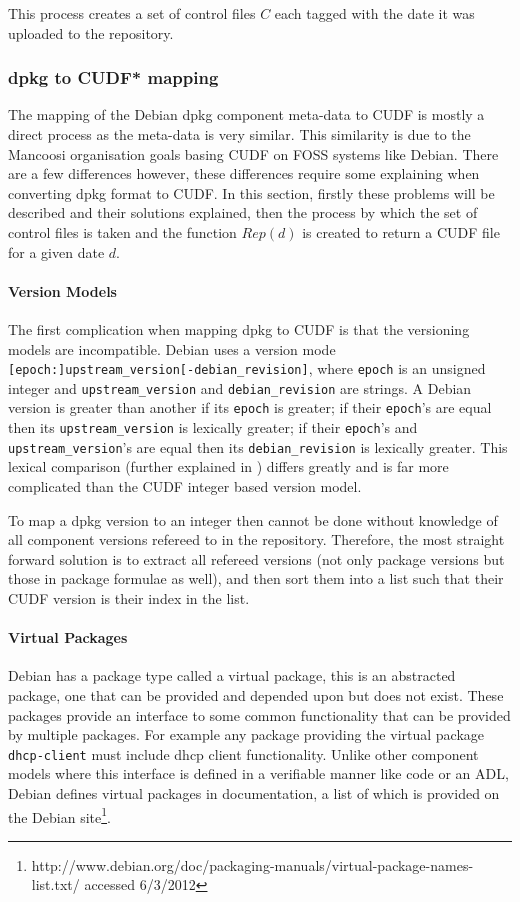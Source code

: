 This process creates a set of control files $C$ each tagged with the date it was uploaded to the repository.

\subsubsection{dpkg to CUDF* mapping}
\label{ubuntusimulation.debtocudf}
The mapping of the Debian dpkg component meta-data to CUDF is mostly a direct process as the meta-data is very similar.
This similarity is due to the Mancoosi organisation goals basing CUDF on FOSS systems like Debian.  
There are a few differences however, these differences require some explaining when converting dpkg format to CUDF.
In this section, firstly these problems will be described and their solutions explained, 
then the process by which the set of control files is taken and the function $Rep(d)$ is created to return a CUDF file for a given date $d$.

\paragraph{Version Models}
The first complication when mapping dpkg to CUDF is that the versioning models are incompatible.
Debian uses a version mode \verb+[epoch:]upstream_version[-debian_revision]+,
where \verb+epoch+ is an unsigned integer and \verb+upstream_version+ and \verb+debian_revision+ are strings.
A Debian version is greater than another if its \verb+epoch+ is greater; 
if their \verb+epoch+'s are equal then its \verb+upstream_version+ is lexically greater; 
if their \verb+epoch+'s and \verb+upstream_version+'s are equal then its \verb+debian_revision+ is lexically greater.
This lexical comparison (further explained in \citep{Barth2005}) differs greatly and is far more complicated than the CUDF integer based version model.

To map a dpkg version to an integer then cannot be done without knowledge of all component versions refereed to in the repository.
Therefore, the most straight forward solution is to extract all refereed versions (not only package versions but those in package formulae as well),
and then sort them into a list such that their CUDF version is their index in the list.

\paragraph{Virtual Packages}
Debian has a package type called a virtual package, this is an abstracted package, one that can be provided and depended upon but does not exist.
These packages provide an interface to some common functionality that can be provided by multiple packages.
For example any package providing the virtual package \verb+dhcp-client+ must include dhcp client functionality. 
Unlike other component models where this interface is defined in a verifiable manner like code or an ADL,
Debian defines virtual packages in documentation, a list of which is provided on the Debian site\footnote{http://www.debian.org/doc/packaging-manuals/virtual-package-names-list.txt/ accessed 6/3/2012}.

